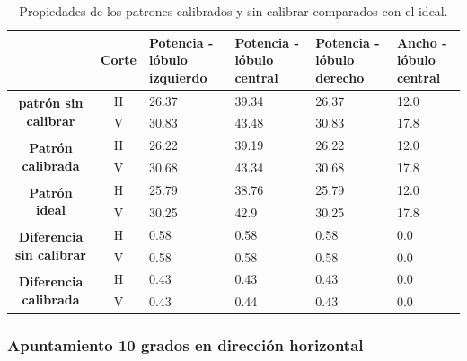 \begin{table}[H]
  \footnotesize
  \centering
  \begin{tabular}{|c|c|p{2cm}|p{2cm}|p{2cm}|p{2cm}|}
    \cline{2-6}
    \multicolumn{1}{c|}{} & \textbf{Corte} & \textbf{Potencia - lóbulo izquierdo} & \textbf{Potencia - lóbulo central} &
    \textbf{Potencia - lóbulo derecho} & \textbf{Ancho - lóbulo central} \tabularnewline\hline
    \multirow{2}{*}{\textbf{patrón sin calibrar}} & H & 26.37 & 39.34 & 26.37 & 12.0 \tabularnewline\cline{2-6}
     & V & 30.83 & 43.48 & 30.83 & 17.8 \tabularnewline\hline
    \multirow{2}{*}{\textbf{Patrón calibrada}} & H & 26.22 & 39.19 & 26.22 & 12.0 \tabularnewline\cline{2-6}
     & V & 30.68 & 43.34 & 30.68 & 17.8 \tabularnewline\hline
    \multirow{2}{*}{\textbf{Patrón ideal}} & H & 25.79 & 38.76 & 25.79 & 12.0 \tabularnewline\cline{2-6}
     & V & 30.25 & 42.9 & 30.25 & 17.8 \tabularnewline\hline
    \multirow{2}{*}{\textbf{Diferencia sin calibrar}} & H & 0.58 & 0.58 & 0.58 & 0.0\tabularnewline\cline{2-6}
     & V & 0.58 & 0.58 & 0.58 & 0.0 \tabularnewline\hline
    \multirow{2}{*}{\textbf{Diferencia calibrada}} & H & 0.43 & 0.43 & 0.43 & 0.0 \tabularnewline\cline{2-6}
     & V & 0.43 & 0.44 & 0.43 & 0.0 \tabularnewline\hline
  \end{tabular}
  \caption{Propiedades de los patrones calibrados y sin calibrar comparados con el ideal.}
  \label{tab:nonErrClassical0deg}
\end{table}


\subsubsection{Apuntamiento 10 grados en dirección horizontal}

